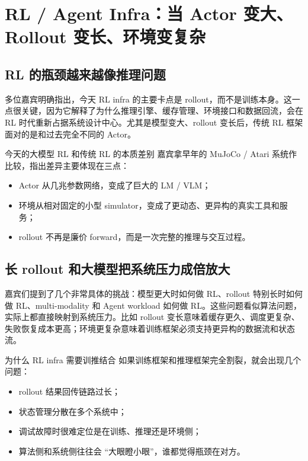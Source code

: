 \section{RL / Agent Infra：当 Actor 变大、Rollout 变长、环境变复杂}

\subsection{RL 的瓶颈越来越像推理问题}
多位嘉宾明确指出，今天 RL infra 的主要卡点是 rollout，而不是训练本身。这一点很关键，因为它解释了为什么推理引擎、缓存管理、环境接口和数据回流，会在 RL 时代重新占据系统设计中心。尤其是模型变大、rollout 变长后，传统 RL 框架面对的是和过去完全不同的 Actor。

\begin{importantbox}{今天的大模型 RL 和传统 RL 的本质差别}
嘉宾拿早年的 MuJoCo / Atari 系统作比较，指出差异主要体现在三点：
\begin{itemize}
  \item Actor 从几兆参数网络，变成了巨大的 LM / VLM；
  \item 环境从相对固定的小型 simulator，变成了更动态、更异构的真实工具和服务；
  \item rollout 不再是廉价 forward，而是一次完整的推理与交互过程。
\end{itemize}
\end{importantbox}

\subsection{长 rollout 和大模型把系统压力成倍放大}
嘉宾们提到了几个非常具体的挑战：模型更大时如何做 RL、rollout 特别长时如何做 RL、multi-modality 和 Agent workload 如何做 RL。这些问题看似算法问题，实际上都直接映射到系统压力。比如 rollout 变长意味着缓存更久、调度更复杂、失败恢复成本更高；环境更复杂意味着训练框架必须支持更异构的数据流和状态流。

\begin{knowledgebox}{为什么 RL infra 需要训推结合}
如果训练框架和推理框架完全割裂，就会出现几个问题：
\begin{itemize}
  \item rollout 结果回传链路过长；
  \item 状态管理分散在多个系统中；
  \item 调试故障时很难定位是在训练、推理还是环境侧；
  \item 算法侧和系统侧往往会 ``大眼瞪小眼''，谁都觉得瓶颈在对方。
\end{itemize}
\end{knowledgebox}

